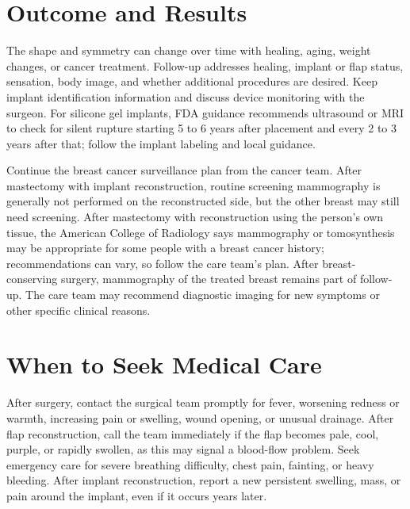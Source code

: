 \section*{Outcome and Results}
The shape and symmetry can change over time with healing, aging, weight changes, or cancer treatment. Follow-up addresses healing, implant or flap status, sensation, body image, and whether additional procedures are desired. Keep implant identification information and discuss device monitoring with the surgeon. For silicone gel implants, FDA guidance recommends ultrasound or MRI to check for silent rupture starting 5 to 6 years after placement and every 2 to 3 years after that; follow the implant labeling and local guidance.

Continue the breast cancer surveillance plan from the cancer team. After mastectomy with implant reconstruction, routine screening mammography is generally not performed on the reconstructed side, but the other breast may still need screening. After mastectomy with reconstruction using the person's own tissue, the American College of Radiology says mammography or tomosynthesis may be appropriate for some people with a breast cancer history; recommendations can vary, so follow the care team's plan. After breast-conserving surgery, mammography of the treated breast remains part of follow-up. The care team may recommend diagnostic imaging for new symptoms or other specific clinical reasons.

\section*{When to Seek Medical Care}
After surgery, contact the surgical team promptly for fever, worsening redness or warmth, increasing pain or swelling, wound opening, or unusual drainage. After flap reconstruction, call the team immediately if the flap becomes pale, cool, purple, or rapidly swollen, as this may signal a blood-flow problem. Seek emergency care for severe breathing difficulty, chest pain, fainting, or heavy bleeding. After implant reconstruction, report a new persistent swelling, mass, or pain around the implant, even if it occurs years later.

